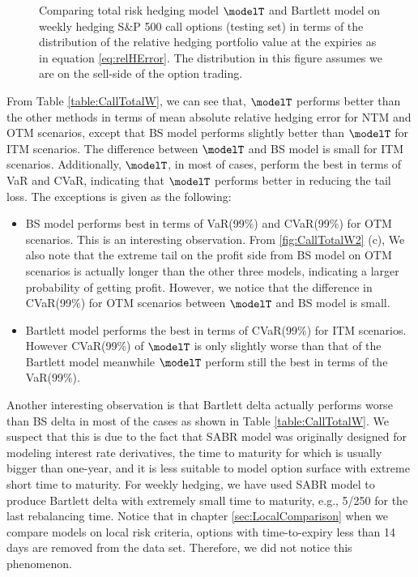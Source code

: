 \begin{figure}[htp!]
	\caption{Comparing total risk hedging model $\modelT$ and Bartlett model on weekly hedging S\&P 500 call options (testing set) in terms of the distribution of the  relative hedging portfolio value at the expiries as in equation \eqref{eq:relHError}. The distribution in this figure assumes we are on the sell-side of the option trading.} \label{fig:CallTotalW3}
\end{figure}

From Table \ref{table:CallTotalW}, we can see that, $\modelT$ performs better than the other  methods in terms of 
mean absolute relative hedging error for NTM and OTM scenarios, except that BS model performs slightly better than   $\modelT$ for ITM scenarios. The difference between  $\modelT$  and BS model is small for ITM scenarios. Additionally, $\modelT$, in most of cases, perform the best in terms of VaR and CVaR, indicating that $\modelT$ performs better in reducing the tail loss.  The exceptions is given as the following:
\begin{itemize}
	\item  BS model performs best in terms of  VaR(99\%) and  CVaR(99\%) for OTM scenarios. This is an interesting observation. From \ref{fig:CallTotalW2} (c), We also note that the extreme tail on the profit side from BS model on OTM scenarios is actually longer than the other three models, indicating a larger probability of getting  profit. However, we notice that the difference in  CVaR(99\%) for OTM scenarios between  $\modelT$ and BS model is small. 
	\item Bartlett model performs the best in terms of  CVaR(99\%) for ITM scenarios. However CVaR(99\%)  of $\modelT$ is only slightly worse than that of the Bartlett model meanwhile $\modelT$ perform still the best in terms of   the VaR(99\%).
\end{itemize}

Another interesting observation is that Bartlett delta actually performs worse than BS delta in most of the cases as shown in Table \ref{table:CallTotalW}. We suspect that this is due to the fact that SABR model was originally designed for modeling interest rate derivatives, the time to maturity for which is usually bigger than one-year, and it is less suitable to model option surface with extreme short time to maturity\cite{chen2011calibration}. For weekly hedging, we have used SABR model to produce Bartlett delta with extremely small time to maturity, e.g., 5/250 for the last rebalancing time.
Notice that in chapter \ref{sec:LocalComparison} when we compare models on local risk criteria, options with time-to-expiry less than 14 days are removed from the data set. Therefore, we did not notice this phenomenon.

